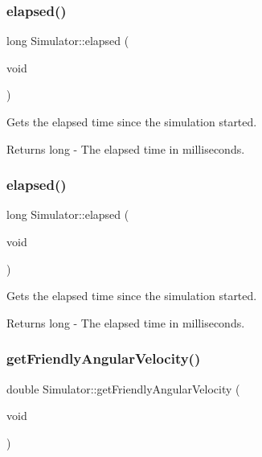 \subsubsection{\texorpdfstring{elapsed()}{elapsed()}\hspace{0.1cm}{\footnotesize\ttfamily [1/2]}}
{\footnotesize\ttfamily long Simulator\+::elapsed (\begin{DoxyParamCaption}\item[{void}]{ }\end{DoxyParamCaption})}



Gets the elapsed time since the simulation started. 

\begin{DoxyReturn}{Returns}
long -\/ The elapsed time in milliseconds. 
\end{DoxyReturn}
\mbox{\label{classSimulator_acd0a0ca3e9d25ea92ffc05e14b77c5e6}} 
\subsubsection{\texorpdfstring{elapsed()}{elapsed()}\hspace{0.1cm}{\footnotesize\ttfamily [2/2]}}
{\footnotesize\ttfamily long Simulator\+::elapsed (\begin{DoxyParamCaption}\item[{void}]{ }\end{DoxyParamCaption})}



Gets the elapsed time since the simulation started. 

\begin{DoxyReturn}{Returns}
long -\/ The elapsed time in milliseconds. 
\end{DoxyReturn}
\mbox{\label{classSimulator_a054241a50cbf232b71acdaf4290855d3}} 
\subsubsection{\texorpdfstring{get\+Friendly\+Angular\+Velocity()}{getFriendlyAngularVelocity()}\hspace{0.1cm}{\footnotesize\ttfamily [1/2]}}
{\footnotesize\ttfamily double Simulator\+::get\+Friendly\+Angular\+Velocity (\begin{DoxyParamCaption}\item[{void}]{ }\end{DoxyParamCaption})}



